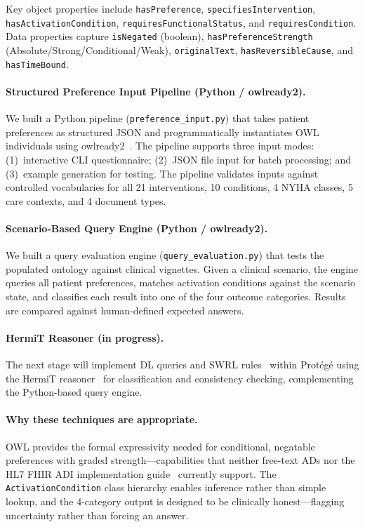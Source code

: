 \documentclass[11pt]{article}
\newcommand{\onto}[1]{\texttt{#1}}
\begin{document}
Key object properties include \onto{hasPreference}, \onto{specifiesIntervention}, \onto{hasActivationCondition}, \onto{requiresFunctionalStatus}, and \onto{requiresCondition}. Data properties capture \onto{isNegated} (boolean), \onto{hasPreferenceStrength} (Absolute/Strong/Conditional/Weak), \onto{originalText}, \onto{hasReversibleCause}, and \onto{hasTimeBound}.

\paragraph{Structured Preference Input Pipeline (Python / owlready2).}
We built a Python pipeline (\texttt{preference\_input.py}) that takes patient preferences as structured JSON and programmatically instantiates OWL individuals using owlready2~\cite{owlready2}. The pipeline supports three input modes: (1)~interactive CLI questionnaire; (2)~JSON file input for batch processing; and (3)~example generation for testing. The pipeline validates inputs against controlled vocabularies for all 21 interventions, 10 conditions, 4 NYHA classes, 5 care contexts, and 4 document types.

\paragraph{Scenario-Based Query Engine (Python / owlready2).}
We built a query evaluation engine (\texttt{query\_evaluation.py}) that tests the populated ontology against clinical vignettes. Given a clinical scenario, the engine queries all patient preferences, matches activation conditions against the scenario state, and classifies each result into one of the four outcome categories. Results are compared against human-defined expected answers.

\paragraph{HermiT Reasoner (in progress).}
The next stage will implement DL queries and SWRL rules~\cite{swrl} within Prot\'eg\'e using the HermiT reasoner~\cite{hermit} for classification and consistency checking, complementing the Python-based query engine.

\paragraph{Why these techniques are appropriate.}
OWL provides the formal expressivity needed for conditional, negatable preferences with graded strength---capabilities that neither free-text ADs nor the HL7 FHIR ADI implementation guide~\cite{hl7adi2024} currently support. The \onto{ActivationCondition} class hierarchy enables inference rather than simple lookup, and the 4-category output is designed to be clinically honest---flagging uncertainty rather than forcing an answer.
\end{document}
